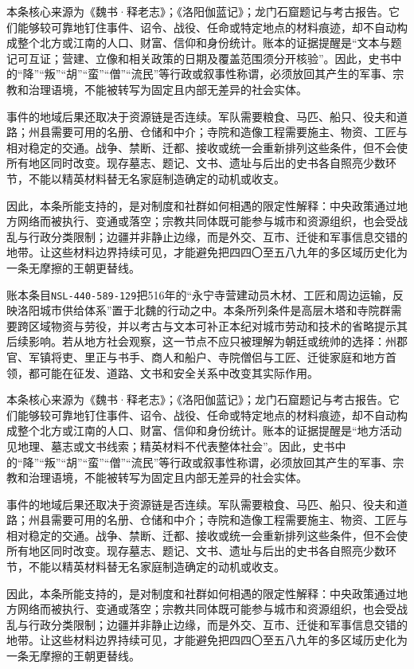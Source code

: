 本条核心来源为《魏书·释老志》；《洛阳伽蓝记》；龙门石窟题记与考古报告。它们能够较可靠地钉住事件、诏令、战役、任命或特定地点的材料痕迹，却不自动构成整个北方或江南的人口、财富、信仰和身份统计。账本的证据提醒是“文本与题记可互证；营建、立像和相关政策的日期及覆盖范围须分开核验”。因此，史书中的“降”“叛”“胡”“蛮”“僧”“流民”等行政或叙事性称谓，必须放回其产生的军事、宗教和治理语境，不能被转写为固定且内部无差异的社会实体。

事件的地域后果还取决于资源链是否连续。军队需要粮食、马匹、船只、役夫和道路；州县需要可用的名册、仓储和中介；寺院和造像工程需要施主、物资、工匠与相对稳定的交通。战争、禁断、迁都、接收或统一会重新排列这些条件，但不会使所有地区同时改变。现存墓志、题记、文书、遗址与后出的史书各自照亮少数环节，不能以精英材料替无名家庭制造确定的动机或收支。

因此，本条所能支持的，是对制度和社群如何相遇的限定性解释：中央政策通过地方网络而被执行、变通或落空；宗教共同体既可能参与城市和资源组织，也会受战乱与行政分类限制；边疆并非静止边缘，而是外交、互市、迁徙和军事信息交错的地带。让这些材料边界持续可见，才能避免把四四〇至五八九年的多区域历史化为一条无摩擦的王朝更替线。

账本条目\texttt{NSL-440-589-129}把516年的“永宁寺营建动员木材、工匠和周边运输，反映洛阳城市供给体系”置于北魏的行动之中。本条所列条件是高层木塔和寺院群需要跨区域物资与劳役，并以考古与文本可补正本纪对城市劳动和技术的省略提示其后续影响。若从地方社会观察，这一节点不应只被理解为朝廷或统帅的选择：州郡官、军镇将吏、里正与书手、商人和船户、寺院僧侣与工匠、迁徙家庭和地方首领，都可能在征发、道路、文书和安全关系中改变其实际作用。

本条核心来源为《魏书·释老志》；《洛阳伽蓝记》；龙门石窟题记与考古报告。它们能够较可靠地钉住事件、诏令、战役、任命或特定地点的材料痕迹，却不自动构成整个北方或江南的人口、财富、信仰和身份统计。账本的证据提醒是“地方活动见地理、墓志或文书线索；精英材料不代表整体社会”。因此，史书中的“降”“叛”“胡”“蛮”“僧”“流民”等行政或叙事性称谓，必须放回其产生的军事、宗教和治理语境，不能被转写为固定且内部无差异的社会实体。

事件的地域后果还取决于资源链是否连续。军队需要粮食、马匹、船只、役夫和道路；州县需要可用的名册、仓储和中介；寺院和造像工程需要施主、物资、工匠与相对稳定的交通。战争、禁断、迁都、接收或统一会重新排列这些条件，但不会使所有地区同时改变。现存墓志、题记、文书、遗址与后出的史书各自照亮少数环节，不能以精英材料替无名家庭制造确定的动机或收支。

因此，本条所能支持的，是对制度和社群如何相遇的限定性解释：中央政策通过地方网络而被执行、变通或落空；宗教共同体既可能参与城市和资源组织，也会受战乱与行政分类限制；边疆并非静止边缘，而是外交、互市、迁徙和军事信息交错的地带。让这些材料边界持续可见，才能避免把四四〇至五八九年的多区域历史化为一条无摩擦的王朝更替线。

